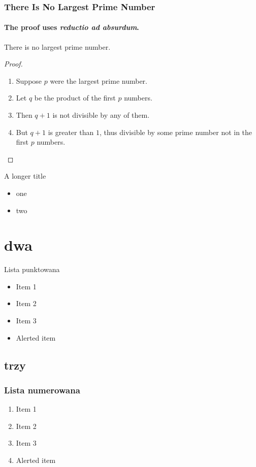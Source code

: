 \documentclass[lualatex,aspectratio=54,12pt,]{beamer}
\begin{document}
\begin{frame}
 \frametitle{There Is No Largest Prime Number}
 \framesubtitle{The proof uses \textit{reductio ad absurdum}.}
 \begin{theorem}
  There is no largest prime number. 
  \end{theorem}
  \begin{proof}%
 \begin{enumerate}
  \item<1-| alert@1> Suppose $p$ were the largest prime number.
  \item<2-> Let $q$ be the product of the first $p$ numbers.
  \item<3-> Then $q+1$ is not divisible by any of them.
  \item<1-> But $q + 1$ is greater than $1$, thus divisible by some prime
        number not in the first $p$ numbers.
 \end{enumerate}
 \end{proof}
\end{frame}

\begin{frame}{A longer title}
 \begin{itemize}
  \item one
  \item two
 \end{itemize}
\end{frame}

\section{dwa}

\begin{frame}{Lista punktowana}
 \begin{itemize}
  \item
        Item 1
  \item
        Item 2
  \item
        Item 3
  \item
        \alert{Alerted item}
 \end{itemize}
\end{frame}

\subsection{trzy}

\begin{frame}
 \frametitle{Lista numerowana}
 \begin{enumerate}
  \item
        Item 1
  \item
        Item 2
  \item
        Item 3
  \item
        \alert{Alerted item}
 \end{enumerate}
\end{frame}
\end{document}
